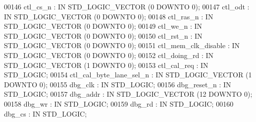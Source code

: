 \begin{DoxyCode}
{00146         ctl\_cs\_n    : \textcolor{keywordflow}{IN} \textcolor{comment}{STD\_LOGIC\_VECTOR} (\textcolor{vhdllogic}{}\textcolor{vhdllogic}{0} \textcolor{keywordflow}{DOWNTO} \textcolor{vhdllogic}{}\textcolor{vhdllogic}{0});
00147         ctl\_odt : \textcolor{keywordflow}{IN} \textcolor{comment}{STD\_LOGIC\_VECTOR} (\textcolor{vhdllogic}{}\textcolor{vhdllogic}{0} \textcolor{keywordflow}{DOWNTO} \textcolor{vhdllogic}{}\textcolor{vhdllogic}{0});
00148         ctl\_ras\_n   : \textcolor{keywordflow}{IN} \textcolor{comment}{STD\_LOGIC\_VECTOR} (\textcolor{vhdllogic}{}\textcolor{vhdllogic}{0} \textcolor{keywordflow}{DOWNTO} \textcolor{vhdllogic}{}\textcolor{vhdllogic}{0});
00149         ctl\_we\_n    : \textcolor{keywordflow}{IN} \textcolor{comment}{STD\_LOGIC\_VECTOR} (\textcolor{vhdllogic}{}\textcolor{vhdllogic}{0} \textcolor{keywordflow}{DOWNTO} \textcolor{vhdllogic}{}\textcolor{vhdllogic}{0});
00150         ctl\_rst\_n   : \textcolor{keywordflow}{IN} \textcolor{comment}{STD\_LOGIC\_VECTOR} (\textcolor{vhdllogic}{}\textcolor{vhdllogic}{0} \textcolor{keywordflow}{DOWNTO} \textcolor{vhdllogic}{}\textcolor{vhdllogic}{0});
00151         ctl\_mem\_clk\_disable : \textcolor{keywordflow}{IN} \textcolor{comment}{STD\_LOGIC\_VECTOR} (\textcolor{vhdllogic}{}\textcolor{vhdllogic}{0} \textcolor{keywordflow}{DOWNTO} \textcolor{vhdllogic}{}\textcolor{vhdllogic}{0});
00152         ctl\_doing\_rd    : \textcolor{keywordflow}{IN} \textcolor{comment}{STD\_LOGIC\_VECTOR} (\textcolor{vhdllogic}{}\textcolor{vhdllogic}{1} \textcolor{keywordflow}{DOWNTO} \textcolor{vhdllogic}{}\textcolor{vhdllogic}{0});
00153         ctl\_cal\_req : \textcolor{keywordflow}{IN} \textcolor{comment}{STD\_LOGIC};
00154         ctl\_cal\_byte\_lane\_sel\_n : \textcolor{keywordflow}{IN} \textcolor{comment}{STD\_LOGIC\_VECTOR} (\textcolor{vhdllogic}{}\textcolor{vhdllogic}{1} \textcolor{keywordflow}{DOWNTO} \textcolor{vhdllogic}{}\textcolor{vhdllogic}{0});
00155         dbg\_clk : \textcolor{keywordflow}{IN} \textcolor{comment}{STD\_LOGIC};
00156         dbg\_reset\_n : \textcolor{keywordflow}{IN} \textcolor{comment}{STD\_LOGIC};
00157         dbg\_addr    : \textcolor{keywordflow}{IN} \textcolor{comment}{STD\_LOGIC\_VECTOR} (\textcolor{vhdllogic}{}\textcolor{vhdllogic}{12} \textcolor{keywordflow}{DOWNTO} \textcolor{vhdllogic}{}\textcolor{vhdllogic}{0});
00158         dbg\_wr  : \textcolor{keywordflow}{IN} \textcolor{comment}{STD\_LOGIC};
00159         dbg\_rd  : \textcolor{keywordflow}{IN} \textcolor{comment}{STD\_LOGIC};
00160         dbg\_cs  : \textcolor{keywordflow}{IN} \textcolor{comment}{STD\_LOGIC};
}
\end{DoxyCode}
